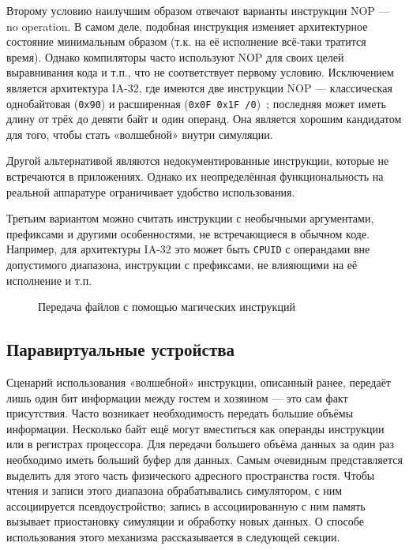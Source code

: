 Второму условию наилучшим образом отвечают варианты инструкции NOP --- no operation. В самом деле, подобная инструкция изменяет архитектурное состояние минимальным образом (т.к. на её исполнение всё-таки тратится время). Однако компиляторы часто используют NOP для своих целей выравнивания кода и т.п., что не соответствует первому условию. Исключением является архитектура IA-32, где имеются две инструкции NOP --- классическая однобайтовая (\texttt{0x90}) и  расширенная (\texttt{0x0F 0x1F /0})~\cite{intelmanual2a}; последняя может иметь длину от трёх до девяти байт и один операнд. Она является хорошим кандидатом для того, чтобы стать «волшебной» внутри симуляции.

Другой альтернативой являются недокументированные инструкции, которые не встречаются в приложениях. Однако их неопределённая функциональность на реальной аппаратуре ограничивает удобство использования.

Третьим вариантом можно считать инструкции с необычными аргументами, префиксами и другими особенностями, не встречающиеся в обычном коде. Например, для архитектуры IA-32 это может быть \texttt{CPUID} с операндами вне допустимого диапазона, инструкции с префиксами, не влияющими на её исполнение и т.п.

\begin{figure}[htp]
    \centering
    \caption{Передача файлов с помощью магических инструкций}
    \label{fig:magic-inst}
\end{figure}

\subsection{Паравиртуальные устройства}

Сценарий использования «волшебной» инструкции, описанный ранее, передаёт лишь один бит информации между гостем и хозяином --- это сам факт присутствия. Часто возникает необходимость передать большие объёмы информации. Несколько байт ещё могут вместиться как операнды инструкции или в регистрах процессора. Для передачи большего объёма данных за один раз необходимо иметь больший буфер для данных. Самым очевидным представляется выделить для этого часть физического адресного пространства гостя. Чтобы чтения и записи этого диапазона обрабатывались симулятором, с ним ассоциируется псевдоустройство; запись в ассоциированную с ним память вызывает приостановку симуляции и обработку новых данных. О способе использования этого механизма рассказывается в следующей секции.


